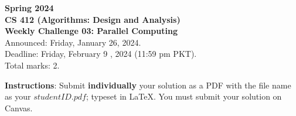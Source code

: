 \documentclass[a4paper]{exam}
\begin{document}
\begin{center}
{\Large \textbf{Spring 2024}}\vspace{1.0em}\\
{\Large \textbf{CS 412 (Algorithms: Design and Analysis)}}\vspace{1.0em}\\
{\Large \textbf{Weekly Challenge 03: Parallel Computing}}\vspace{1.0em}\\
{\Large Announced: Friday, January 26, 2024.}\\
\vspace{.25em}
{\Large Deadline: Friday, February 9 , 2024 (11:59 pm PKT).}\\ 
\vspace{.3em}
{\Large Total marks: 2.}
\vspace{.5em}\\
\end{center}
\textbf{Instructions}: Submit \textbf{individually} your solution as a PDF with the file name as your $studentID.pdf$; typeset in LaTeX. You must submit your solution on Canvas.
\end{document}
